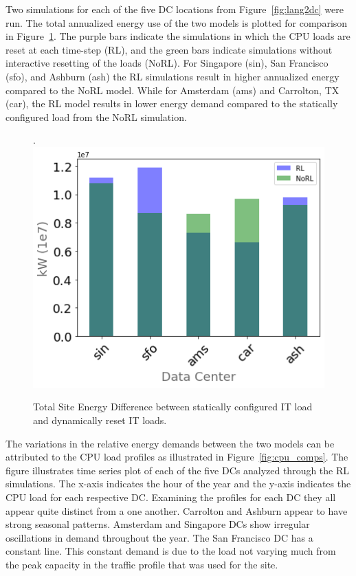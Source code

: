 Two simulations for each of the five DC locations from Figure~\ref{fig:lang2dc} were run. The total annualized energy use of the two models is plotted for comparison in Figure~\ref{fig:total_energy_comp}. The purple bars indicate the simulations in which the CPU loads are reset at each time-step (RL), and the green bars indicate simulations without interactive resetting of the loads (NoRL). For Singapore (sin), San Francisco (sfo), and Ashburn (ash) the RL simulations result in higher annualized energy compared to the NoRL model. While for Amsterdam (ams) and Carrolton, TX (car), the RL model results in lower energy demand compared to the statically configured load from the NoRL simulation.

\begin{figure}.
  \centering
  \includegraphics[scale=0.45]{img/total_energy_comp.png}
  \caption{Total Site Energy Difference between statically configured IT load and dynamically reset IT loads.}
  \label{fig:total_energy_comp}
  \end{figure}

The variations in the relative energy demands between the two models can be attributed to the CPU load profiles as illustrated in Figure~\ref{fig:cpu_comps}. The figure illustrates time series plot of each of the five DCs analyzed through the RL simulations. The x-axis indicates the hour of the year and the y-axis indicates the CPU load for each respective DC. Examining the profiles for each DC they all appear quite distinct from a one another. Carrolton and Ashburn appear to have strong seasonal patterns. Amsterdam and Singapore DCs show irregular oscillations in demand throughout the year. The San Francisco DC has a constant line. This constant demand is due to the load not varying much from the peak capacity in the traffic profile that was used for the site. 

